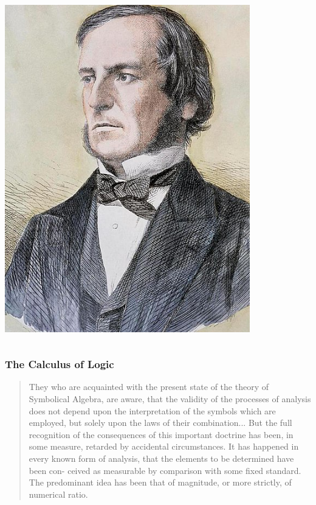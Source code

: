 \documentclass[compress,12pt]{beamer}
\begin{document}
\begin{frame}
\begin{columns}
\begin{column}{0.5\textwidth}
\begin{center}
                \includegraphics[width=0.8\textwidth]{boole}
            \end{center}
        \end{column}
    \end{columns}
\end{frame}

\begin{frame}
    \frametitle{The Calculus of Logic}
    \begin{quote}
        They who are acquainted with the present state of the theory
        of Symbolical Algebra, are aware, that the validity of the
        processes of analysis does not depend upon the interpretation
        of the symbols which are employed, but solely upon the laws
        of their combination... But the full recognition of the consequences of this important
        doctrine has been, in some measure, retarded by accidental
        circumstances. It has happened in every known form of
        analysis, that the elements to be determined have been con-
        ceived as measurable by comparison with some fixed standard.
        The predominant idea has been that of magnitude, or more
        strictly, of numerical ratio.
    \end{quote}
\end{frame}
\end{document}

